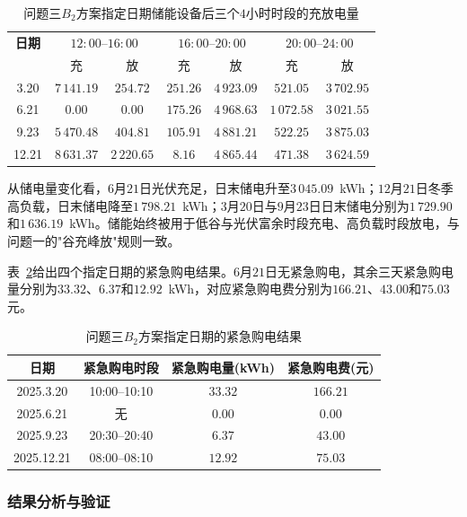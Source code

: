 \documentclass[12pt,a4paper]{ctexart}
\theoremstyle{definition}
\theoremstyle{plain}
\theoremstyle{remark}
\begin{document}
\begin{table}[H]
\centering
\caption{问题三$B_2$方案指定日期储能设备后三个$4$小时时段的充放电量}
\label{tab:q3_storage_2}
\begin{tabular}{c|cc|cc|cc}
\toprule
\textbf{日期} & \multicolumn{2}{c|}{$12{:}00$--$16{:}00$} & \multicolumn{2}{c|}{$16{:}00$--$20{:}00$} & \multicolumn{2}{c}{$20{:}00$--$24{:}00$} \\
 & 充 & 放 & 充 & 放 & 充 & 放 \\
\midrule
3.20 & $7\,141.19$ & $254.72$ & $251.26$ & $4\,923.09$ & $521.05$ & $3\,702.95$ \\
6.21 & $0.00$ & $0.00$ & $175.26$ & $4\,968.63$ & $1\,072.58$ & $3\,021.55$ \\
9.23 & $5\,470.48$ & $404.81$ & $105.91$ & $4\,881.21$ & $522.25$ & $3\,875.03$ \\
12.21 & $8\,631.37$ & $2\,220.65$ & $8.16$ & $4\,865.44$ & $471.38$ & $3\,624.59$ \\
\bottomrule
\end{tabular}
\end{table}

\noindent 从储电量变化看，$6$月$21$日光伏充足，日末储电升至$3\,045.09$~kWh；$12$月$21$日冬季高负载，日末储电降至$1\,798.21$~kWh；$3$月$20$日与$9$月$23$日日末储电分别为$1\,729.90$和$1\,636.19$~kWh。储能始终被用于低谷与光伏富余时段充电、高负载时段放电，与问题一的"谷充峰放"规则一致。

表~\ref{tab:q3_emergency}给出四个指定日期的紧急购电结果。$6$月$21$日无紧急购电，其余三天紧急购电量分别为$33.32$、$6.37$和$12.92$~kWh，对应紧急购电费分别为$166.21$、$43.00$和$75.03$元。

\begin{table}[H]
\centering
\caption{问题三$B_2$方案指定日期的紧急购电结果}
\label{tab:q3_emergency}
\begin{tabular}{cccc}
\toprule
\textbf{日期} & \textbf{紧急购电时段} & \textbf{紧急购电量(kWh)} & \textbf{紧急购电费(元)} \\
\midrule
2025.3.20  & 10:00--10:10 & $33.32$ & $166.21$ \\
2025.6.21  & 无 & $0.00$ & $0.00$ \\
2025.9.23  & 20:30--20:40 & $6.37$ & $43.00$ \\
2025.12.21 & 08:00--08:10 & $12.92$ & $75.03$ \\
\bottomrule
\end{tabular}
\end{table}

\subsubsection{结果分析与验证}
\end{document}
